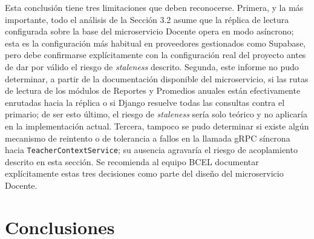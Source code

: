 \documentclass[11pt,a4paper]{article}
\begin{document}
Esta conclusión tiene tres limitaciones que deben reconocerse. Primera, y la más importante, todo el análisis de la Sección 3.2 asume que la réplica de lectura configurada sobre la base del microservicio Docente opera en modo asíncrono; esta es la configuración más habitual en proveedores gestionados como Supabase, pero debe confirmarse explícitamente con la configuración real del proyecto antes de dar por válido el riesgo de \emph{staleness} descrito. Segunda, este informe no pudo determinar, a partir de la documentación disponible del microservicio, si las rutas de lectura de los módulos de Reportes y Promedios anuales están efectivamente enrutadas hacia la réplica o si Django resuelve todas las consultas contra el primario; de ser esto último, el riesgo de \emph{staleness} sería solo teórico y no aplicaría en la implementación actual. Tercera, tampoco se pudo determinar si existe algún mecanismo de reintento o de tolerancia a fallos en la llamada gRPC síncrona hacia \texttt{TeacherContextService}; su ausencia agravaría el riesgo de acoplamiento descrito en esta sección. Se recomienda al equipo BCEL documentar explícitamente estas tres decisiones como parte del diseño del microservicio Docente.

\section{Conclusiones}
\end{document}
